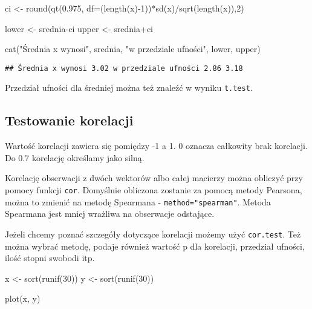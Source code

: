\documentclass[
]{book}
\newenvironment{Shaded}{\begin{snugshade}}{\end{snugshade}}
\newcommand{\AttributeTok}[1]{\textcolor[rgb]{0.77,0.63,0.00}{#1}}
\newcommand{\DecValTok}[1]{\textcolor[rgb]{0.00,0.00,0.81}{#1}}
\newcommand{\FloatTok}[1]{\textcolor[rgb]{0.00,0.00,0.81}{#1}}
\newcommand{\FunctionTok}[1]{\textcolor[rgb]{0.00,0.00,0.00}{#1}}
\newcommand{\NormalTok}[1]{#1}
\newcommand{\OtherTok}[1]{\textcolor[rgb]{0.56,0.35,0.01}{#1}}
\newcommand{\SpecialCharTok}[1]{\textcolor[rgb]{0.00,0.00,0.00}{#1}}
\newcommand{\StringTok}[1]{\textcolor[rgb]{0.31,0.60,0.02}{#1}}
\begin{document}
\begin{Shaded}
\begin{Highlighting}[]
\NormalTok{ci }\OtherTok{\textless{}{-}} \FunctionTok{round}\NormalTok{(}\FunctionTok{qt}\NormalTok{(}\FloatTok{0.975}\NormalTok{, }\AttributeTok{df=}\NormalTok{(}\FunctionTok{length}\NormalTok{(x)}\SpecialCharTok{{-}}\DecValTok{1}\NormalTok{))}\SpecialCharTok{*}\FunctionTok{sd}\NormalTok{(x)}\SpecialCharTok{/}\FunctionTok{sqrt}\NormalTok{(}\FunctionTok{length}\NormalTok{(x)),}\DecValTok{2}\NormalTok{)}

\NormalTok{lower }\OtherTok{\textless{}{-}}\NormalTok{ srednia}\SpecialCharTok{{-}}\NormalTok{ci}
\NormalTok{upper }\OtherTok{\textless{}{-}}\NormalTok{ srednia}\SpecialCharTok{+}\NormalTok{ci}

\FunctionTok{cat}\NormalTok{(}\StringTok{"Średnia x wynosi"}\NormalTok{, srednia, }\StringTok{"w przedziale ufności"}\NormalTok{, lower, upper)}
\end{Highlighting}
\end{Shaded}

\begin{verbatim}
## Średnia x wynosi 3.02 w przedziale ufności 2.86 3.18
\end{verbatim}

Przedział ufności dla średniej można też znaleźć w wyniku \texttt{t.test}.

\hypertarget{testowanie-korelacji}{%
\subsection{Testowanie korelacji}\label{testowanie-korelacji}}

Wartość korelacji zawiera się pomiędzy -1 a 1. 0 oznacza całkowity brak korelacji. Do 0.7 korelację określamy jako silną.

Korelację obserwacji z dwóch wektorów albo całej macierzy można obliczyć przy pomocy funkcji \texttt{cor}. Domyślnie obliczona zostanie za pomocą metody Pearsona, można to zmienić na metodę Spearmana - \texttt{method="spearman"}. Metoda Spearmana jest mniej wrażliwa na obserwacje odstające.

Jeżeli chcemy poznać szczegóły dotyczące korelacji możemy użyć \texttt{cor.test}. Też można wybrać metodę, podaje również wartość p dla korelacji, przedział ufności, ilość stopni swobodi itp.

\begin{Shaded}
\begin{Highlighting}[]
\NormalTok{x }\OtherTok{\textless{}{-}} \FunctionTok{sort}\NormalTok{(}\FunctionTok{runif}\NormalTok{(}\DecValTok{30}\NormalTok{))}
\NormalTok{y }\OtherTok{\textless{}{-}} \FunctionTok{sort}\NormalTok{(}\FunctionTok{runif}\NormalTok{(}\DecValTok{30}\NormalTok{))}

\FunctionTok{plot}\NormalTok{(x, y)}
\end{Highlighting}
\end{Shaded}
\end{document}
